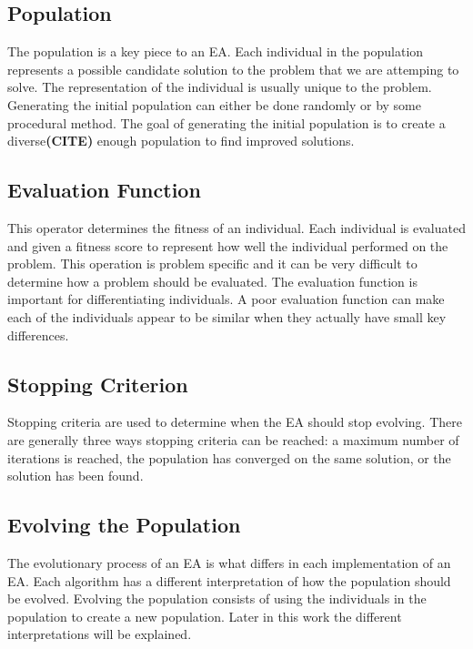 \subsection{Population}

The population is a key piece to an EA. Each individual in the population represents a possible candidate solution to the problem that we are attemping to solve. The representation of the individual is usually unique to the problem. Generating the initial population can either be done randomly or by some procedural method. The goal of generating the initial population is to create a diverse\textbf{(CITE)} enough population to find improved solutions.

\subsection{Evaluation Function}

This operator determines the fitness of an individual. Each individual is evaluated and given a fitness score to represent how well the individual performed on the problem. This operation is problem specific and it can be very difficult to determine how a problem should be evaluated. The evaluation function is important for differentiating individuals. A poor evaluation function can make each of the individuals appear to be similar when they actually have small key differences. 

\subsection{Stopping Criterion}

Stopping criteria are used to determine when the EA should stop evolving. There are generally three ways stopping criteria can be reached: a maximum number of iterations is reached, the population has converged on the same solution, or the solution has been found.

\subsection{Evolving the Population}

The evolutionary process of an EA is what differs in each implementation of an EA. Each algorithm has a different interpretation of how the population should be evolved. Evolving the population consists of using the individuals in the population to create a new population. Later in this work the different interpretations will be explained.